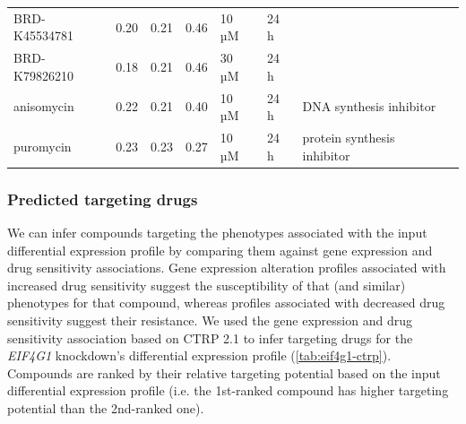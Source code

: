 \begin{table}[!h]
\begin{tabular}{llllllll}
BRD-K45534781     & 0.20                           & 0.21                           & 0.46          & 10 µM         & 24 h               &                              \\
BRD-K79826210     & 0.18                           & 0.21                           & 0.46          & 30 µM         & 24 h               &                              \\
anisomycin        & 0.22                           & 0.21                           & 0.40          & 10 µM         & 24 h               & DNA synthesis inhibitor      \\
puromycin         & 0.23                           & 0.23                           & 0.27          & 10 µM         & 24 h               & protein synthesis inhibitor \\
\bottomrule
\end{tabular}
\end{table}

\subsubsection{Predicted targeting drugs}

We can infer compounds targeting the phenotypes associated with the input differential expression profile by comparing them against gene expression and drug sensitivity associations. Gene expression alteration profiles associated with increased drug sensitivity suggest the susceptibility of that (and similar) phenotypes for that compound, whereas profiles associated with decreased drug sensitivity suggest their resistance. We used the gene expression and drug sensitivity association based on CTRP 2.1 to infer targeting drugs for the \emph{EIF4G1} knockdown's differential expression profile (\autoref{tab:eif4g1-ctrp}). Compounds are ranked by their relative targeting potential based on the input differential expression profile (i.e. the 1st-ranked compound has higher targeting potential than the 2nd-ranked one).

